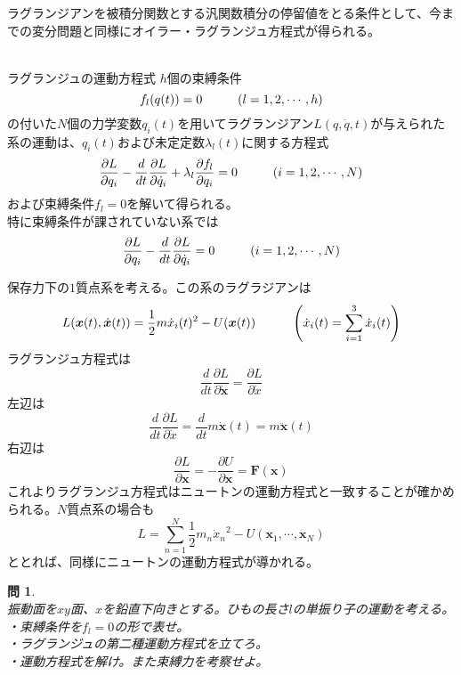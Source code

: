 \documentclass{jsarticle}
\newtheorem{pro}{問}[section]
\begin{document}
ラグランジアンを被積分関数とする汎関数積分の停留値をとる条件として、今までの変分問題と同様にオイラー・ラグランジュ方程式が得られる。\\
\\
\begin{itembox}[l]{ラグランジュの運動方程式}
\(h\)個の束縛条件
\[f_{l}(q(t))=0\hspace{10mm}(l=1,2,\cdots,h)\]
の付いた\(N\)個の力学変数\(q_{i}(t)\)を用いてラグランジアン\(L(q,\dot{q},t)\)が与えられた系の運動は、\(q_{i}(t)\)および未定定数\(\lambda_{l}(t)\)に関する方程式
\[\frac{\partial L}{\partial q_{i}}-\frac{d}{dt}\frac{\partial L}{\partial\dot{q}_{i}}+\lambda_{l}\frac{\partial f_{l}}{\partial q_{i}}=0\hspace{10mm}(i=1,2,\cdots,N)\]
および束縛条件\(f_{l}=0\)を解いて得られる。\\
特に束縛条件が課されていない系では
\[\frac{\partial L}{\partial q_{i}}-\frac{d}{dt}\frac{\partial L}{\partial\dot{q}_{i}}=0\hspace{10mm}(i=1,2,\cdots,N)\]
\end{itembox}
保存力下の\(1\)質点系を考える。この系のラグラジアンは
\[L(\bm{x}(t),\dot{\bm{x}}(t))=\frac{1}{2}m\dot{x}_{i}(t)^{2}-U(\bm{x}(t))\hspace{10mm}\left(\dot{x}_{i}(t)=\sum_{i=1}^{3}\dot{x}_{i}(t)\right)\]
ラグランジュ方程式は
\[\frac{d}{dt}\frac{\partial L}{\partial\dot{\bm{x}}}=\frac{\partial L}{\partial\dot{x}}\]
左辺は
\[\frac{d}{dt}\frac{\partial L}{\partial\dot{x}}=\frac{d}{dt}m\dot{\bm{x}}(t)=m\ddot{\bm{x}}(t)\]
右辺は
\[\frac{\partial L}{\partial\bm{x}}=-\frac{\partial U}{\partial\bm{x}}=\bm{F}(\bm{x})\]
これよりラグランジュ方程式はニュートンの運動方程式と一致することが確かめられる。\(N\)質点系の場合も
\[L=\sum_{n=1}^{N}\frac{1}{2}m_{n}{\dot{x}_{n}}^{2}-U(\bm{x}_{1},\cdots,\bm{x}_{N})\]
ととれば、同様にニュートンの運動方程式が導かれる。












\newpage
\begin{pro}~\\
振動面を\(xy\)面、\(x\)を鉛直下向きとする。ひもの長さ\(l\)の単振り子の運動を考える。\\
・束縛条件を\(f_{l}=0\)の形で表せ。\\
・ラグランジュの第二種運動方程式を立てろ。\\
・運動方程式を解け。また束縛力を考察せよ。
\end{pro}
\end{document}
